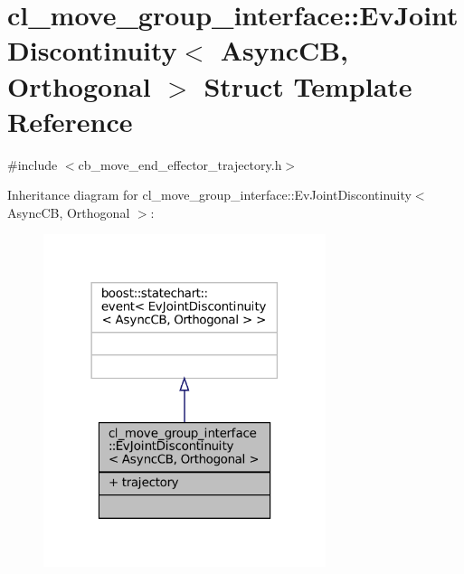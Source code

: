\hypertarget{structcl__move__group__interface_1_1EvJointDiscontinuity}{}\section{cl\+\_\+move\+\_\+group\+\_\+interface\+:\+:Ev\+Joint\+Discontinuity$<$ Async\+CB, Orthogonal $>$ Struct Template Reference}
\label{structcl__move__group__interface_1_1EvJointDiscontinuity}


{\ttfamily \#include $<$cb\+\_\+move\+\_\+end\+\_\+effector\+\_\+trajectory.\+h$>$}



Inheritance diagram for cl\+\_\+move\+\_\+group\+\_\+interface\+:\+:Ev\+Joint\+Discontinuity$<$ Async\+CB, Orthogonal $>$\+:
\nopagebreak
\begin{figure}[H]
\begin{center}
\leavevmode
\includegraphics[width=234pt]{structcl__move__group__interface_1_1EvJointDiscontinuity__inherit__graph}
\end{center}
\end{figure}


